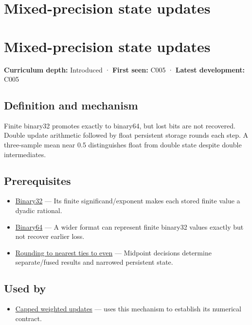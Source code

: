 \hypertarget{appendix-260182e617b7}{}
\section*{Mixed-precision state updates}
\section{Mixed-precision state updates}\label{appendix-260182e617b7-mixed-precision-state-updates}

\textbf{Curriculum depth:} Introduced · \textbf{First seen:} C005 · \textbf{Latest development:} C005

\subsection{Definition and mechanism}\label{appendix-260182e617b7-definition-and-mechanism}

Finite binary32 promotes exactly to binary64, but lost bits are not recovered. Double update arithmetic followed by float persistent storage rounds each step. A three-sample mean near 0.5 distinguishes float from double state despite double intermediates.

\subsection{Prerequisites}\label{appendix-260182e617b7-prerequisites}

\begin{itemize}
\tightlist
\item
  \hyperref[appendix-5057f9ad327f]{Binary32} --- Its finite significand/exponent makes each stored finite value a dyadic rational.
\item
  \hyperref[appendix-5078dfab64e6]{Binary64} --- A wider format can represent finite binary32 values exactly but not recover earlier loss.
\item
  \hyperref[appendix-614afe1de592]{Rounding to nearest ties to even} --- Midpoint decisions determine separate/fused results and narrowed persistent state.
\end{itemize}

\subsection{Used by}\label{appendix-260182e617b7-used-by}

\begin{itemize}
\tightlist
\item
  \hyperref[appendix-1e45d0613db3]{Capped weighted updates} --- uses this mechanism to establish its numerical contract.
\end{itemize}

